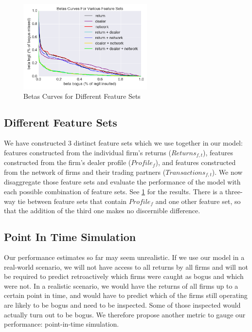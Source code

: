 \begin{figure}[t]
  \includegraphics[width=0.6\textwidth]{graphs/PerformanceDifferentFeatureSets_v3.png}
  \caption{Betas Curves for Different Feature Sets}
  \label{fig:AllDataPerformanceDifferentFeatureSets}
\end{figure}

\subsection{Different Feature Sets}
\label{subsec:feature-sets}
We have constructed 3 distinct feature sets which we use together in our model: features constructed from the individual firm's returns ($Returns_{f,t}$), features constructed from the firm's dealer profile ($Profile_f$), and features constructed from the network of firms and their trading partners ($Transactions_{f,t}$). We now disaggregate those feature sets and evaluate the performance of the model with each possible combination of feature sets. See \cref{fig:AllDataPerformanceDifferentFeatureSets} for the results. There is a three-way tie between feature sets that contain $Profile_f$ and one other feature set, so that the addition of the third one makes no discernible difference.


\subsection{Point In Time Simulation}
\label{subsec:PITSimulation}
Our performance estimates so far may seem unrealistic. If we use our model in a real-world scenario, we will not have access to all returns by all firms and will not be required to predict retroactively which firms were caught as bogus and which were not. In a realistic scenario, we would have the returns of all firms up to a certain point in time, and would have to predict which of the firms still operating are likely to be bogus and need to be inspected. Some of those inspected would actually turn out to be bogus. We therefore propose another metric to gauge our performance: point-in-time simulation. 

